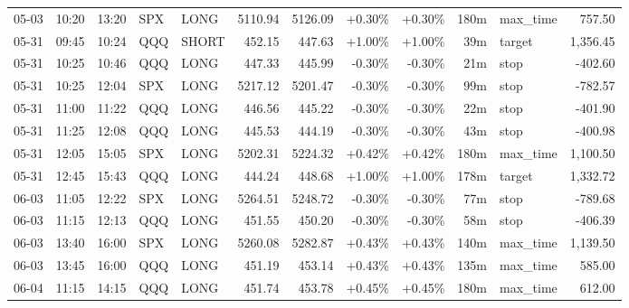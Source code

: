 \documentclass[11pt,a4paper,twoside]{article}
\begin{document}
\begin{center}
\begin{longtable}{>{\color{txtmain}}l l l l l r r r r r >{\color{txtmain}}l r}
05-03 & 10:20 & 13:20 & SPX & LONG & 5110.94 & 5126.09 & \textcolor{wingreen}{+0.30\%} & \textcolor{wingreen}{+0.30\%} & 180m & max\_time & \textcolor{wingreen}{757.50} \\
05-31 & 09:45 & 10:24 & QQQ & SHORT & 452.15 & 447.63 & \textcolor{wingreen}{+1.00\%} & \textcolor{wingreen}{+1.00\%} & 39m & target & \textcolor{wingreen}{1,356.45} \\
05-31 & 10:25 & 10:46 & QQQ & LONG & 447.33 & 445.99 & \textcolor{lossred}{-0.30\%} & \textcolor{lossred}{-0.30\%} & 21m & stop & \textcolor{lossred}{-402.60} \\
05-31 & 10:25 & 12:04 & SPX & LONG & 5217.12 & 5201.47 & \textcolor{lossred}{-0.30\%} & \textcolor{lossred}{-0.30\%} & 99m & stop & \textcolor{lossred}{-782.57} \\
05-31 & 11:00 & 11:22 & QQQ & LONG & 446.56 & 445.22 & \textcolor{lossred}{-0.30\%} & \textcolor{lossred}{-0.30\%} & 22m & stop & \textcolor{lossred}{-401.90} \\
05-31 & 11:25 & 12:08 & QQQ & LONG & 445.53 & 444.19 & \textcolor{lossred}{-0.30\%} & \textcolor{lossred}{-0.30\%} & 43m & stop & \textcolor{lossred}{-400.98} \\
05-31 & 12:05 & 15:05 & SPX & LONG & 5202.31 & 5224.32 & \textcolor{wingreen}{+0.42\%} & \textcolor{wingreen}{+0.42\%} & 180m & max\_time & \textcolor{wingreen}{1,100.50} \\
05-31 & 12:45 & 15:43 & QQQ & LONG & 444.24 & 448.68 & \textcolor{wingreen}{+1.00\%} & \textcolor{wingreen}{+1.00\%} & 178m & target & \textcolor{wingreen}{1,332.72} \\
06-03 & 11:05 & 12:22 & SPX & LONG & 5264.51 & 5248.72 & \textcolor{lossred}{-0.30\%} & \textcolor{lossred}{-0.30\%} & 77m & stop & \textcolor{lossred}{-789.68} \\
06-03 & 11:15 & 12:13 & QQQ & LONG & 451.55 & 450.20 & \textcolor{lossred}{-0.30\%} & \textcolor{lossred}{-0.30\%} & 58m & stop & \textcolor{lossred}{-406.39} \\
06-03 & 13:40 & 16:00 & SPX & LONG & 5260.08 & 5282.87 & \textcolor{wingreen}{+0.43\%} & \textcolor{wingreen}{+0.43\%} & 140m & max\_time & \textcolor{wingreen}{1,139.50} \\
06-03 & 13:45 & 16:00 & QQQ & LONG & 451.19 & 453.14 & \textcolor{wingreen}{+0.43\%} & \textcolor{wingreen}{+0.43\%} & 135m & max\_time & \textcolor{wingreen}{585.00} \\
06-04 & 11:15 & 14:15 & QQQ & LONG & 451.74 & 453.78 & \textcolor{wingreen}{+0.45\%} & \textcolor{wingreen}{+0.45\%} & 180m & max\_time & \textcolor{wingreen}{612.00} \\

\end{longtable}
\end{center}
\end{document}
